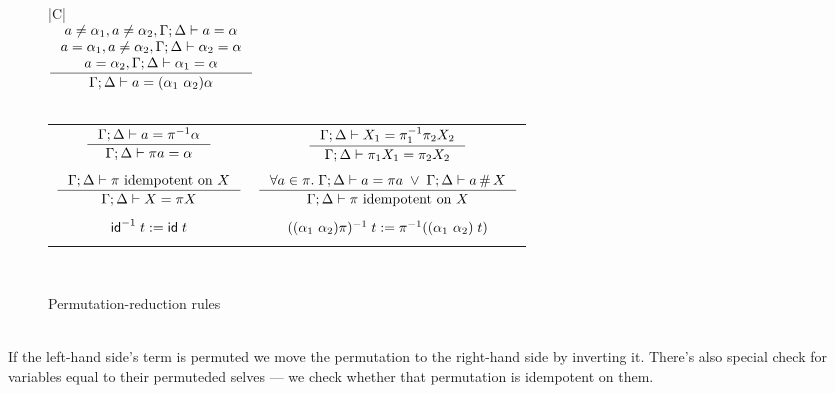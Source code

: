 \documentclass[english, mgr]{iithesis}
\newcommand{\solverRule}{\vdash}
\begin{document}
\begin{figure}[htbp]
    \centering
    \begin{tabularx}{\textwidth}{|C|}
      \hline \\ $
      \inference{
        \atomv \cneq \atomexp_1, \atomv \cneq \atomexp_2, \cEnv ; \icEnv \solverRule \atomv     = \atomexp \\
        \atomv \ceq  \atomexp_1, \atomv \cneq \atomexp_2, \cEnv ; \icEnv \solverRule \atomexp_2 = \atomexp \\
        \atomv \ceq  \atomexp_2, \cEnv ; \icEnv \solverRule \atomexp_1 = \atomexp
      }{
        \cEnv ; \icEnv \solverRule \atomv = \permswap{\atomexp_1}{\atomexp_2}{\atomexp}
      }
      $ \\ \\
    \begin{tabular}{cc}
      $
      \inference{
        \cEnv ; \icEnv \solverRule \atomv = \perm^{-1} \atomexp
      }{
        \cEnv ; \icEnv \solverRule \perm \atomv = \atomexp
      }
      $ & $
      \inference{
        \cEnv ; \icEnv \solverRule \termv_1 = \pi_1^{-1} \pi_2 \termv_2
      }{
        \cEnv ; \icEnv \solverRule \pi_1 \termv_1 = \pi_2 \termv_2
      }
      $ \\ & \\
      $
      \inference{
        \cEnv ; \icEnv \solverRule \pi \text{ idempotent on } \termv
      }{
        \cEnv ; \icEnv \solverRule \termv = \pi \termv
      }
      $ & $
      \inference{
        \forall \atomv \in \pi.\;
          \cEnv ; \icEnv \solverRule \atomv = \pi \atomv \;\vee\;
          \cEnv ; \icEnv \solverRule \atomv \cfresh \termv
        }{
        \cEnv ; \icEnv \solverRule \pi \text{ idempotent on } \termv
      }
      $ \\ & \\
      $
      \mathsf{id} ^ {-1} \;t := \mathsf{id}\;t
      $ & $
      ((\alpha_1\ \alpha_2) \pi) ^ {-1} \;t
        := \pi^{-1}((\alpha_1\ \alpha_2) \;t)
      $ \\ & \\
    \end{tabular} \\
    \hline
    \end{tabularx}
  \caption{Permutation-reduction rules}
  \label{fig:permutation-reduction-rules}
\end{figure}
\\
If the left-hand side's term is permuted we move the permutation
to the right-hand side by inverting it.
There's also special check for variables equal to their permuteded selves
--- we check whether that permutation is idempotent on them.
\end{document}
